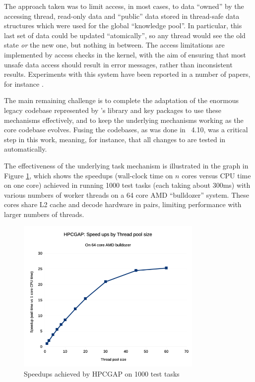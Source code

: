 The approach taken was to limit access, in most cases, to
data ``owned'' by the accessing thread, read-only data and ``public''
data stored in thread-safe data structures which were used for the
global ``knowledge pool''. In particular, this last set of data could
be updated ``atomically'', so any thread would see the old state
\emph{or} the new one, but nothing in between. The access limitations are implemented by
access checks in the kernel, with the aim of ensuring that most unsafe
data access should result in error messages, rather than inconsistent
results. Experiments with this system have been reported in a number
of papers, for instance \cite{HPCGAP-paper}.

The main remaining challenge is to complete the adaptation of the
enormous legacy codebase represented by \GAP's library and key
packages to use these mechanisms effectively, and to keep the
underlying mechanisms working as the core \GAP codebase
evolves. Fusing the codebases, as was done in \GAP~4.10, was a critical
step in this work, meaning, for instance, that all changes to \GAP are
tested in \HPCGAP automatically.

The effectiveness of the underlying task mechanism is illustrated in
the graph in Figure \ref{fig:hpcgap-speedups}, which shows the speedups (wall-clock time on $n$
cores versus CPU time on one core) achieved in running 1000 test tasks
(each taking about 300ms) with various numbers of worker threads on a 64
core AMD ``bulldozer'' system. These cores share L2 cache and decode
hardware in pairs, limiting performance with larger numbers of
threads.

\begin{figure}[!ht]
    \centering
    \includegraphics[width=0.8\textwidth]{images/hpcgap-speedups}
    \caption{Speedups achieved by HPCGAP on 1000 test tasks}\label{fig:hpcgap-speedups}
\end{figure}


